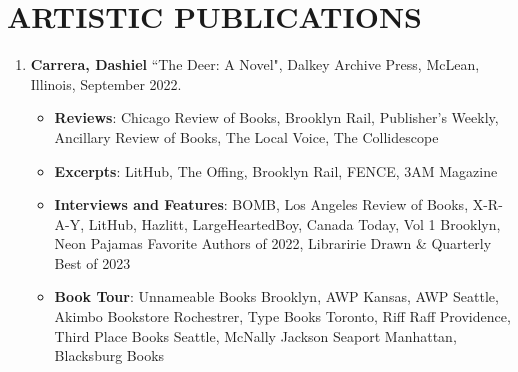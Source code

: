  \section{ARTISTIC PUBLICATIONS}
 \begin{enumerate}
 
 \subsection{Novels}
 \item \textbf{Carrera, Dashiel} ``The Deer: A Novel", Dalkey Archive Press, McLean, Illinois, September 2022. \\
 	\begin{itemize}
		\item \textbf{Reviews}: Chicago Review of Books, Brooklyn Rail, Publisher's Weekly, Ancillary Review of Books, The Local Voice, The Collidescope
		\item \textbf{Excerpts}: LitHub, The Offing, Brooklyn Rail, FENCE, 3AM Magazine
		\item \textbf{Interviews and Features}: BOMB, Los Angeles Review of Books, X-R-A-Y, LitHub, Hazlitt, LargeHeartedBoy, Canada Today, Vol 1 Brooklyn, Neon Pajamas Favorite Authors of 2022, Libraririe Drawn \& Quarterly Best of 2023	
		\item \textbf{Book Tour}: Unnameable Books Brooklyn, AWP Kansas, AWP Seattle, Akimbo Bookstore Rochestrer, Type Books Toronto, Riff Raff Providence, Third Place Books Seattle, McNally Jackson Seaport Manhattan, Blacksburg Books	
	\end{itemize} 
 

\end{enumerate}
